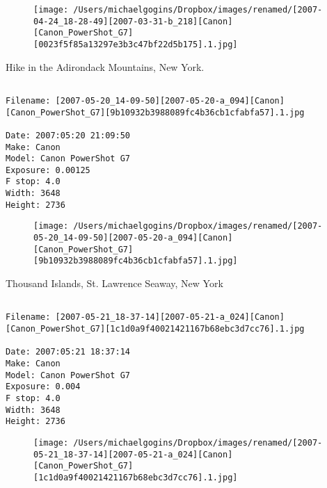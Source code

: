 \documentclass[11pt,letter,DIV=14,paper=landscape]{scrbook}
\begin{document}
\begin{figure}
\texttt{[image: /Users/michaelgogins/Dropbox/images/renamed/[2007-04-24\_18-28-49][2007-03-31-b\_218][Canon][Canon\_PowerShot\_G7][0023f5f85a13297e3b3c47bf22d5b175].1.jpg]}
\end{figure}
    
\clearpage
\noindent Hike in the Adirondack Mountains, New York.
\noindent
\begin{lstlisting}

Filename: [2007-05-20_14-09-50][2007-05-20-a_094][Canon][Canon_PowerShot_G7][9b10932b3988089fc4b36cb1cfabfa57].1.jpg

Date: 2007:05:20 21:09:50
Make: Canon
Model: Canon PowerShot G7
Exposure: 0.00125
F stop: 4.0
Width: 3648
Height: 2736
\end{lstlisting}
\clearpage

\begin{figure}
\texttt{[image: /Users/michaelgogins/Dropbox/images/renamed/[2007-05-20\_14-09-50][2007-05-20-a\_094][Canon][Canon\_PowerShot\_G7][9b10932b3988089fc4b36cb1cfabfa57].1.jpg]}
\end{figure}
    
\clearpage
\noindent Thousand Islands, St. Lawrence Seaway, New York
\noindent
\begin{lstlisting}

Filename: [2007-05-21_18-37-14][2007-05-21-a_024][Canon][Canon_PowerShot_G7][1c1d0a9f40021421167b68ebc3d7cc76].1.jpg

Date: 2007:05:21 18:37:14
Make: Canon
Model: Canon PowerShot G7
Exposure: 0.004
F stop: 4.0
Width: 3648
Height: 2736
\end{lstlisting}
\clearpage

\begin{figure}
\texttt{[image: /Users/michaelgogins/Dropbox/images/renamed/[2007-05-21\_18-37-14][2007-05-21-a\_024][Canon][Canon\_PowerShot\_G7][1c1d0a9f40021421167b68ebc3d7cc76].1.jpg]}
\end{figure}
    
\end{document}
